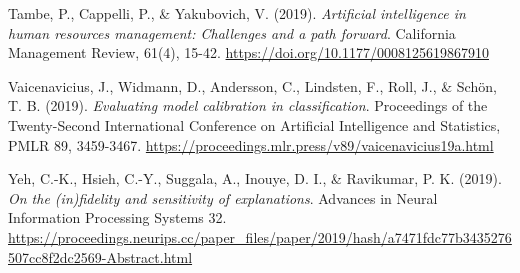 \documentclass[
  a4paper,
  review]{elsarticle}
\newlength{\cslhangindent}
\newenvironment{CSLReferences}[2] %
 {\begin{list}{}{%
  \setlength{\itemindent}{0pt}
  \setlength{\leftmargin}{0pt}
  \setlength{\parsep}{0pt}
  \ifodd #1
   \setlength{\leftmargin}{\cslhangindent}
   \setlength{\itemindent}{-1\cslhangindent}
  \fi
  \setlength{\itemsep}{#2\baselineskip}}}
 {\end{list}}
\begin{document}
\begin{CSLReferences}{1}{0}
Tambe, P., Cappelli, P., \& Yakubovich, V. (2019). \emph{Artificial
intelligence in human resources management: Challenges and a path
forward}. California Management Review, 61(4), 15-42.
\url{https://doi.org/10.1177/0008125619867910}

Vaicenavicius, J., Widmann, D., Andersson, C., Lindsten, F., Roll, J.,
\& Schön, T. B. (2019). \emph{Evaluating model calibration in
classification}. Proceedings of the Twenty-Second International
Conference on Artificial Intelligence and Statistics, PMLR 89,
3459-3467. \url{https://proceedings.mlr.press/v89/vaicenavicius19a.html}

Yeh, C.-K., Hsieh, C.-Y., Suggala, A., Inouye, D. I., \& Ravikumar, P.
K. (2019). \emph{On the (in)fidelity and sensitivity of explanations}.
Advances in Neural Information Processing Systems 32.
\url{https://proceedings.neurips.cc/paper_files/paper/2019/hash/a7471fdc77b3435276507cc8f2dc2569-Abstract.html}

\end{CSLReferences}
\end{document}

